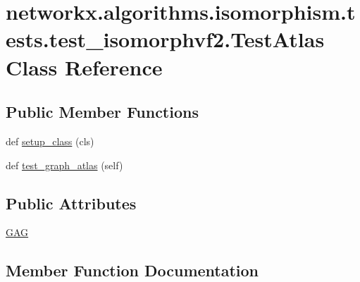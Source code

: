 \hypertarget{classnetworkx_1_1algorithms_1_1isomorphism_1_1tests_1_1test__isomorphvf2_1_1TestAtlas}{}\section{networkx.\+algorithms.\+isomorphism.\+tests.\+test\+\_\+isomorphvf2.\+Test\+Atlas Class Reference}
\label{classnetworkx_1_1algorithms_1_1isomorphism_1_1tests_1_1test__isomorphvf2_1_1TestAtlas}
\subsection*{Public Member Functions}
\begin{DoxyCompactItemize}
\item 
def \hyperlink{classnetworkx_1_1algorithms_1_1isomorphism_1_1tests_1_1test__isomorphvf2_1_1TestAtlas_a19b084f08a44dcc921d231753ae97bea}{setup\+\_\+class} (cls)
\item 
def \hyperlink{classnetworkx_1_1algorithms_1_1isomorphism_1_1tests_1_1test__isomorphvf2_1_1TestAtlas_a075564db023de22706b35176f058f136}{test\+\_\+graph\+\_\+atlas} (self)
\end{DoxyCompactItemize}
\subsection*{Public Attributes}
\begin{DoxyCompactItemize}
\item 
\hyperlink{classnetworkx_1_1algorithms_1_1isomorphism_1_1tests_1_1test__isomorphvf2_1_1TestAtlas_a2cf9cce98a0ad3f1f8633d3a83b1c03b}{G\+AG}
\end{DoxyCompactItemize}


\subsection{Member Function Documentation}
\mbox{\label{classnetworkx_1_1algorithms_1_1isomorphism_1_1tests_1_1test__isomorphvf2_1_1TestAtlas_a19b084f08a44dcc921d231753ae97bea}} 
